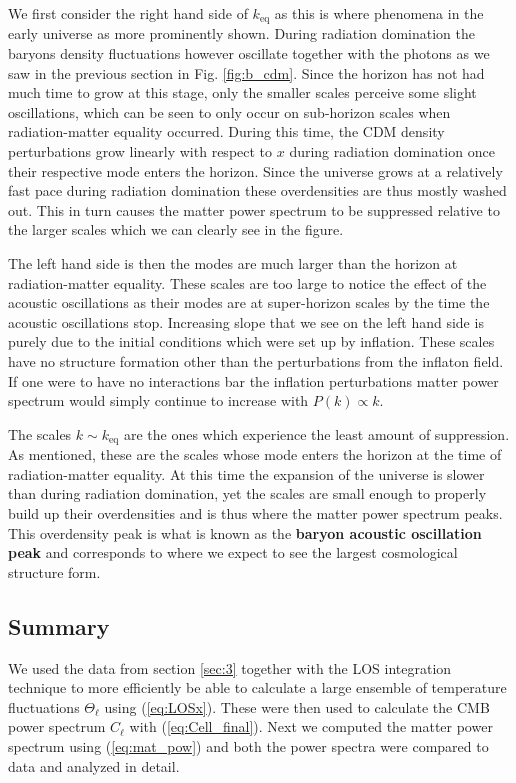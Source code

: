\documentclass[%
reprint,
 amsmath,amssymb,
 aps,
]{revtex4-2}
\begin{document}
We first consider the right hand side of $k_\text{eq}$ as this is where phenomena in the early universe as more prominently shown. During radiation domination the baryons density fluctuations however oscillate together with the photons as we saw in the previous section in Fig. \ref{fig:b_cdm}. Since the horizon has not had much time to grow at this stage, only the smaller scales perceive some slight oscillations, which can be seen to only occur on sub-horizon scales when radiation-matter equality occurred. During this time, the CDM density perturbations grow linearly with respect to $x$ during radiation domination once their respective mode enters the horizon. Since the universe grows at a relatively fast pace during radiation domination these overdensities are thus mostly washed out. This in turn causes the matter power spectrum to be suppressed relative to the larger scales which we can clearly see in the figure.

The left hand side is then the modes are much larger than the horizon at radiation-matter equality. These scales are too large to notice the effect of the acoustic oscillations as their modes are at super-horizon scales by the time the acoustic oscillations stop. Increasing slope that we see on the left hand side is purely due to the initial conditions which were set up by inflation. These scales have no structure formation other than the perturbations from the inflaton field. If one were to have no interactions bar the inflation perturbations matter power spectrum would simply continue to increase with $P(k)\propto k$.

The scales $k\sim k_\text{eq}$ are the ones which experience the least amount of suppression. As mentioned, these are the scales whose mode enters the horizon at the time of radiation-matter equality. At this time the expansion of the universe is slower than during radiation domination, yet the scales are small enough to properly build up their overdensities and is thus where the matter power spectrum peaks. This overdensity peak is what is known as the \textbf{baryon acoustic oscillation peak} and corresponds to where we expect to see the largest cosmological structure form.

\subsection{Summary}
We used the data from section \ref{sec:3} together with the LOS integration technique to more efficiently be able to calculate a large ensemble of temperature fluctuations $\Theta_\ell$ using (\ref{eq:LOSx}). These were then used to calculate the CMB power spectrum $C_\ell$ with (\ref{eq:Cell_final}). Next we computed the matter power spectrum using (\ref{eq:mat_pow}) and both the power spectra were compared to data and analyzed in detail.
\end{document}
